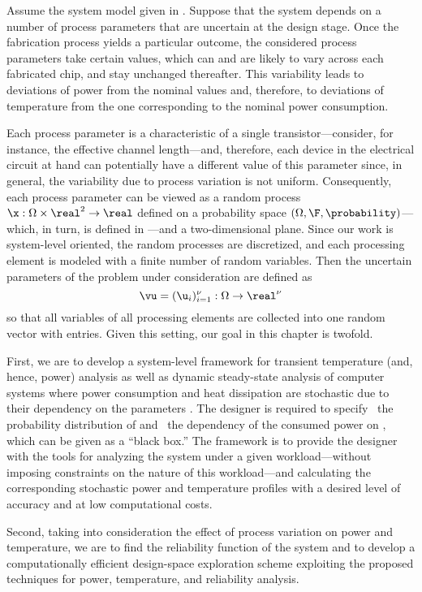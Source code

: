Assume the system model given in . Suppose that the system
depends on a number of process parameters that are uncertain at the design
stage. Once the fabrication process yields a particular outcome, the considered
process parameters take certain values, which can and are likely to vary across
each fabricated chip, and stay unchanged thereafter. This variability leads to
deviations of power from the nominal values and, therefore, to deviations of
temperature from the one corresponding to the nominal power consumption.

Each process parameter is a characteristic of a single transistor---consider,
for instance, the effective channel length---and, therefore, each device in the
electrical circuit at hand can potentially have a different value of this
parameter since, in general, the variability due to process variation is not
uniform. Consequently, each process parameter can be viewed as a random process
$\x: \Omega \times \real^2 \to \real$ defined on a probability space $(\Omega,
\F, \probability)$---which, in turn, is defined in
---and a two-dimensional plane. Since our work is
system-level oriented, the random processes are discretized, and each processing
element is modeled with a finite number of random variables. Then the uncertain
parameters of the problem under consideration are defined as
\[
  \vu = (\u_i)_{i = 1}^\nu: \Omega \to \real^\nu
\]
so that all variables of all processing elements are collected into one random
vector with \nu entries. Given this setting, our goal in this chapter is
twofold.

First, we are to develop a system-level framework for transient temperature
(and, hence, power) analysis as well as dynamic steady-state analysis of
computer systems where power consumption and heat dissipation are stochastic due
to their dependency on the parameters \vu. The designer is required to specify
\one~the probability distribution of \vu and \two~the dependency of the consumed
power on \vu, which can be given as a ``black box.'' The framework is to provide
the designer with the tools for analyzing the system under a given
workload---without imposing constraints on the nature of this workload---and
calculating the corresponding stochastic power \mp and temperature \mq profiles
with a desired level of accuracy and at low computational costs.

Second, taking into consideration the effect of process variation on power and
temperature, we are to find the reliability function of the system and to
develop a computationally efficient design-space exploration scheme exploiting
the proposed techniques for power, temperature, and reliability analysis.

